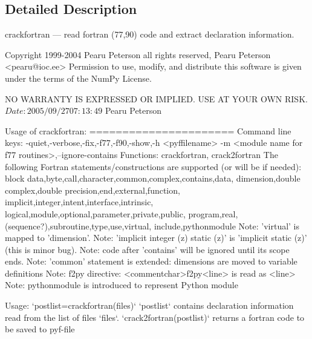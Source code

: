 \subsection{Detailed Description}
\begin{DoxyVerb}crackfortran --- read fortran (77,90) code and extract declaration information.

Copyright 1999-2004 Pearu Peterson all rights reserved,
Pearu Peterson <pearu@ioc.ee>
Permission to use, modify, and distribute this software is given under the
terms of the NumPy License.

NO WARRANTY IS EXPRESSED OR IMPLIED.  USE AT YOUR OWN RISK.
$Date: 2005/09/27 07:13:49 $
Pearu Peterson


Usage of crackfortran:
======================
Command line keys: -quiet,-verbose,-fix,-f77,-f90,-show,-h <pyffilename>
           -m <module name for f77 routines>,--ignore-contains
Functions: crackfortran, crack2fortran
The following Fortran statements/constructions are supported
(or will be if needed):
   block data,byte,call,character,common,complex,contains,data,
   dimension,double complex,double precision,end,external,function,
   implicit,integer,intent,interface,intrinsic,
   logical,module,optional,parameter,private,public,
   program,real,(sequence?),subroutine,type,use,virtual,
   include,pythonmodule
Note: 'virtual' is mapped to 'dimension'.
Note: 'implicit integer (z) static (z)' is 'implicit static (z)' (this is minor bug).
Note: code after 'contains' will be ignored until its scope ends.
Note: 'common' statement is extended: dimensions are moved to variable definitions
Note: f2py directive: <commentchar>f2py<line> is read as <line>
Note: pythonmodule is introduced to represent Python module

Usage:
  `postlist=crackfortran(files)`
  `postlist` contains declaration information read from the list of files `files`.
  `crack2fortran(postlist)` returns a fortran code to be saved to pyf-file


\end{DoxyVerb}
